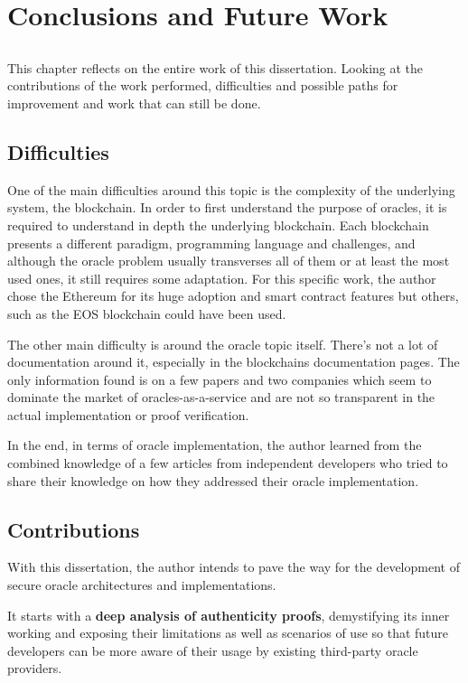 \chapter{Conclusions and Future Work} \label{chap:concl}

\section*{}

This chapter reflects on the entire work of this dissertation. Looking at the contributions of the work performed, difficulties and possible paths for improvement and work that can still be done.

\section{Difficulties}
One of the main difficulties around this topic is the complexity of the underlying system, the blockchain. In order to first understand the purpose of oracles, it is required to understand in depth the underlying blockchain. Each blockchain presents a different paradigm, programming language and challenges, and although the oracle problem usually transverses all of them or at least the most used ones, it still requires some adaptation. For this specific work, the author chose the Ethereum for its huge adoption and smart contract features but others, such as the EOS blockchain could have been used.

The other main difficulty is around the oracle topic itself. There's not a lot of documentation around it, especially in the blockchains documentation pages. The only information found is on a few papers and two companies which seem to dominate the market of oracles-as-a-service and are not so transparent in the actual implementation or proof verification.

In the end, in terms of oracle implementation, the author learned from the combined knowledge of a few articles from independent developers who tried to share their knowledge on how they addressed their oracle implementation.


\section{Contributions}
With this dissertation, the author intends to pave the way for the development of secure oracle architectures and implementations.

It starts with a \textbf{deep analysis of authenticity proofs}, demystifying its inner working and exposing their limitations as well as scenarios of use so that future developers can be more aware of their usage by existing third-party oracle providers.

